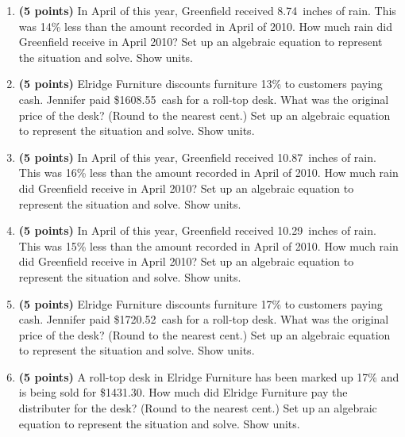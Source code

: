 \documentclass[12pt]{amsart}
\begin{document}
\begin{enumerate}
\vfill 
\def \discount{14}\def \paid{1427.80}\def \rainy{8.74}\def \orcost{1660.23}\def \purcost{1252.46}\def \orrainy{10.16}
\item {\bf (5 points)} 
 In April of this year, Greenfield received \rainy\ inches of rain. This was \discount\% less than the amount recorded in April of 2010. How much rain did Greenfield  receive in April 2010? Set up an algebraic equation to represent the situation and solve. Show units.

\vfill 
\def \discount{13}\def \paid{1608.55}\def \rainy{10.25}\def \orcost{1848.91}\def \purcost{1423.50}\def \orrainy{11.78}
\item {\bf (5 points)} 
 Elridge Furniture discounts furniture \discount\% to customers paying cash. Jennifer paid \$\paid\ cash for a roll-top desk. What was the original price of the desk? (Round to the nearest cent.) Set up an algebraic equation to represent the situation and solve. Show units.

\vfill 
\def \discount{16}\def \paid{1242.45}\def \rainy{10.87}\def \orcost{1479.11}\def \purcost{1071.08}\def \orrainy{12.94}
\item {\bf (5 points)} 
 In April of this year, Greenfield received \rainy\ inches of rain. This was \discount\% less than the amount recorded in April of 2010. How much rain did Greenfield  receive in April 2010? Set up an algebraic equation to represent the situation and solve. Show units.

\vfill 
\def \discount{15}\def \paid{1238.05}\def \rainy{10.29}\def \orcost{1456.53}\def \purcost{1076.57}\def \orrainy{12.11}
\item {\bf (5 points)} 
 In April of this year, Greenfield received \rainy\ inches of rain. This was \discount\% less than the amount recorded in April of 2010. How much rain did Greenfield  receive in April 2010? Set up an algebraic equation to represent the situation and solve. Show units.

\vfill 
\def \discount{17}\def \paid{1720.52}\def \rainy{8.60}\def \orcost{2072.92}\def \purcost{1470.53}\def \orrainy{10.36}
\item {\bf (5 points)} 
 Elridge Furniture discounts furniture \discount\% to customers paying cash. Jennifer paid \$\paid\ cash for a roll-top desk. What was the original price of the desk? (Round to the nearest cent.) Set up an algebraic equation to represent the situation and solve. Show units.

\vfill 
\def \discount{17}\def \paid{1431.30}\def \rainy{10.53}\def \orcost{1724.46}\def \purcost{1223.33}\def \orrainy{12.69}
\item {\bf (5 points)} 
 A roll-top desk in Elridge Furniture has been marked up \discount\% and is being sold for \$\paid. How much did Elridge Furniture pay the distributer for the desk? (Round to the nearest cent.) Set up an algebraic equation to represent the situation and solve. Show units.


\end{enumerate}
\end{document}
